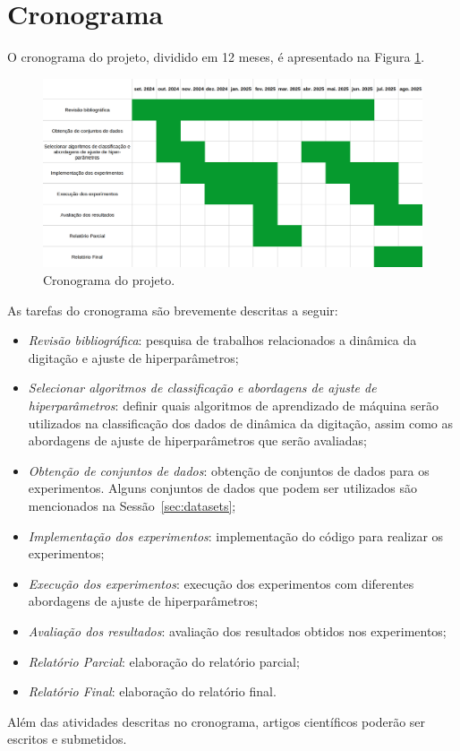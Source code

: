 \section{Cronograma}
\label{sec:cronograma}

O cronograma do projeto, dividido em 12 meses, é apresentado na Figura \ref{fig:cronograma}.

\begin{figure}[H]
    \caption{Cronograma do projeto.}
    \label{fig:cronograma}
    \centering
    \includegraphics[width=\textwidth]{cronograma.png}    
\end{figure}

As tarefas do cronograma são brevemente descritas a seguir:

\begin{itemize}
    \item \textit{Revisão bibliográfica}: pesquisa de trabalhos relacionados a dinâmica da digitação e ajuste de hiperparâmetros;
    \item \textit{Selecionar algoritmos de classificação e abordagens de ajuste de hiperparâmetros}: definir quais algoritmos de aprendizado de máquina serão utilizados na classificação dos dados de dinâmica da digitação, assim como as abordagens de ajuste de hiperparâmetros que serão avaliadas;
    \item \textit{Obtenção de conjuntos de dados}: obtenção de conjuntos de dados para os experimentos. Alguns conjuntos de dados que podem ser utilizados são mencionados na Sessão~\ref{sec:datasets};
    \item \textit{Implementação dos experimentos}: implementação do código para realizar os experimentos;
    \item \textit{Execução dos experimentos}: execução dos experimentos com diferentes abordagens de ajuste de hiperparâmetros;
    \item \textit{Avaliação dos resultados}: avaliação dos resultados obtidos nos experimentos;
    \item \textit{Relatório Parcial}: elaboração do relatório parcial;
    \item \textit{Relatório Final}: elaboração do relatório final.
\end{itemize}

Além das atividades descritas no cronograma, artigos científicos poderão ser escritos e submetidos.